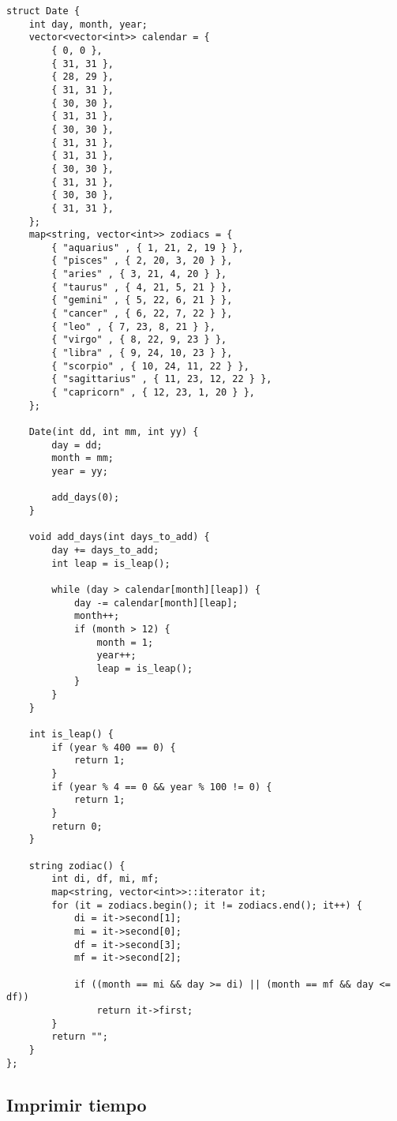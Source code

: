 \documentclass[11pt]{article}
\begin{document}
\begin{lstlisting}
struct Date {
    int day, month, year;
    vector<vector<int>> calendar = {
        { 0, 0 },
        { 31, 31 },
        { 28, 29 },
        { 31, 31 },
        { 30, 30 },
        { 31, 31 },
        { 30, 30 },
        { 31, 31 },
        { 31, 31 },
        { 30, 30 },
        { 31, 31 },
        { 30, 30 },
        { 31, 31 },
    };
    map<string, vector<int>> zodiacs = {
        { "aquarius" , { 1, 21, 2, 19 } },
        { "pisces" , { 2, 20, 3, 20 } },
        { "aries" , { 3, 21, 4, 20 } },
        { "taurus" , { 4, 21, 5, 21 } },
        { "gemini" , { 5, 22, 6, 21 } },
        { "cancer" , { 6, 22, 7, 22 } },
        { "leo" , { 7, 23, 8, 21 } },
        { "virgo" , { 8, 22, 9, 23 } },
        { "libra" , { 9, 24, 10, 23 } },
        { "scorpio" , { 10, 24, 11, 22 } },
        { "sagittarius" , { 11, 23, 12, 22 } },
        { "capricorn" , { 12, 23, 1, 20 } },
    };

    Date(int dd, int mm, int yy) {
        day = dd;
        month = mm;
        year = yy;

        add_days(0);
    }

    void add_days(int days_to_add) {
        day += days_to_add;
        int leap = is_leap();

        while (day > calendar[month][leap]) {
            day -= calendar[month][leap];
            month++;
            if (month > 12) {
                month = 1;
                year++;
                leap = is_leap();
            }
        }
    }

    int is_leap() {
        if (year % 400 == 0) {
            return 1;
        }
        if (year % 4 == 0 && year % 100 != 0) {
            return 1;
        }
        return 0;
    }

    string zodiac() {
        int di, df, mi, mf;
        map<string, vector<int>>::iterator it;
        for (it = zodiacs.begin(); it != zodiacs.end(); it++) {
            di = it->second[1];
            mi = it->second[0];
            df = it->second[3];
            mf = it->second[2];

            if ((month == mi && day >= di) || (month == mf && day <= df))
                return it->first;
        }
        return "";
    }
};
\end{lstlisting}

\subsection{Imprimir tiempo}
\end{document}
